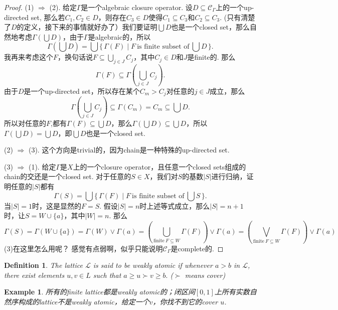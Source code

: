 \documentclass{article}
\newtheorem{example}[theorem]{Example}
\newtheorem{definition}[theorem]{Definition}
\newcommand\Set[2]{\{\,#1\mid#2\,\}} %
\newcommand\lattice{\mathcal{L}}
\begin{document}
\begin{proof}
(1) $\Rightarrow$ (2). 给定$\Gamma$是一个algebraic closure operator. 设$D \subseteq \mathcal{C}_{\Gamma}$上的一个up-directed set, {\color{red}那么若$C_1,C_2 \in D$，则存在$C_3 \in D$使得$C_1 \subseteq C_3$和$C_2 \subseteq C_3$}. (只有清楚了$D$的定义，接下来的事情就好办了）我们要证明$\bigcup D$也是一个closed set，那么自然地考虑$\Gamma(\bigcup D)$，由于$\Gamma$是algebraic的，所以
$$
\Gamma(\bigcup D) = \bigcup \Set{\Gamma(F)}{F\ \text{is finite subset of}\ \bigcup D}.
$$
我再来考虑这个$F$，换句话说$F \subseteq \bigcup\limits_{j \in J} C_j$，其中$C_j \in D$和$J$是finite的. 那么
$$
\Gamma(F) \subseteq \Gamma(\bigcup\limits_{j \in J} C_j). 
$$
由于$D$是一个up-directed set，所以存在某个$C_m > C_j$对任意的$j \in J$成立，那么
$$
\Gamma(\bigcup\limits_{j \in J} C_j) \subseteq \Gamma(C_m) = C_m \subseteq \bigcup D.
$$
所以对任意的$F$,都有$\Gamma(F) \subseteq \bigcup D$，那么$\Gamma(\bigcup D) \subseteq \bigcup D$，所以$\Gamma(\bigcup D) = \bigcup D$，即$\bigcup D$也是一个closed set.

(2) $\Rightarrow$ (3). 这个方向是trivial的，因为chain是一种特殊的up-directed set.

(3) $\Rightarrow$ (1). 给定$\Gamma$是$X$上的一个closure operator，且任意一个closed sets组成的chain的交还是一个closed set. 对于任意的$S \in X$，我们对$S$的基数$|S|$进行归纳，证明任意的$|S|$都有
$$
\Gamma(S) = \bigcup \Set{\Gamma(F)}{F\ \text{is finite subset of}\ \bigcup S}.
$$
当$|S|=1$时，这是显然的$F=S$. 假设$|S| = n$时上述等式成立，那么$|S| = n+1$时，让$S = W \cup \{a\}$，其中$|W| = n$. 那么
$$
\Gamma(S) = \Gamma(W \cup \{a\}) = \Gamma(W) \vee \Gamma(a) = \left( \bigcup\limits_{\text{finite}~F \subseteq W} \Gamma(F) \right) \vee \Gamma(a) = \left( \bigvee\limits_{\text{finite}~F \subseteq W} \Gamma(F) \right) \vee \Gamma(a)$$
(3)在这里怎么用呢？ 感觉有点弱啊，似乎只能说明$\mathcal{C}_\Gamma$是complete的.
\end{proof}

\begin{definition}
\rm The lattice $\lattice$ is said to be {\color{red} weakly atomic} if whenever $a > b$ in $\lattice$, there exist elements $u,v \in L$ such that $a \geq u \succ v \geq b.$ ($\succ$ means cover)
\end{definition}

\begin{example}
\rm 所有的finite lattice都是weakly atomic的；闭区间$[0,1]$上所有实数自然序构成的lattice不是weakly atomic，给定一个$v$，你找不到它的cover $u$.
\end{example}
\end{document}
